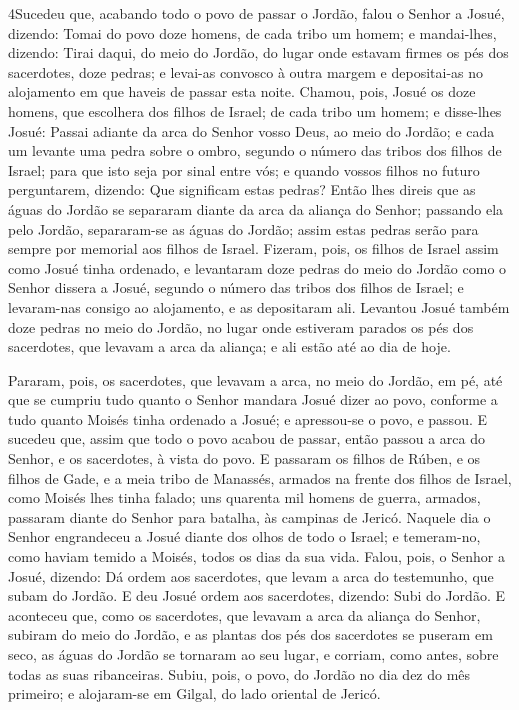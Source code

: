 \medskip

\lettrine{4} Sucedeu que, acabando todo o povo de passar o
Jordão, falou o Senhor a Josué, dizendo: Tomai do povo doze
homens, de cada tribo um homem; e mandai-lhes, dizendo: Tirai
daqui, do meio do Jordão, do lugar onde estavam firmes os pés dos
sacerdotes, doze pedras; e levai-as convosco à outra margem e
depositai-as no alojamento em que haveis de passar esta noite.
Chamou, pois, Josué os doze homens, que escolhera dos filhos de
Israel; de cada tribo um homem; e disse-lhes Josué: Passai
adiante da arca do Senhor vosso Deus, ao meio do Jordão; e cada um
levante uma pedra sobre o ombro, segundo o número das tribos dos
filhos de Israel; para que isto seja por sinal entre vós; e
quando vossos filhos no futuro perguntarem, dizendo: Que significam
estas pedras? Então lhes direis que as águas do Jordão se
separaram diante da arca da aliança do Senhor; passando ela pelo
Jordão, separaram-se as águas do Jordão; assim estas pedras serão
para sempre por memorial aos filhos de Israel. Fizeram, pois, os
filhos de Israel assim como Josué tinha ordenado, e levantaram doze
pedras do meio do Jordão como o Senhor dissera a Josué, segundo o
número das tribos dos filhos de Israel; e levaram-nas consigo ao
alojamento, e as depositaram ali. Levantou Josué também doze
pedras no meio do Jordão, no lugar onde estiveram parados os pés dos
sacerdotes, que levavam a arca da aliança; e ali estão até ao dia de
hoje.

Pararam, pois, os sacerdotes, que levavam a arca, no meio do
Jordão, em pé, até que se cumpriu tudo quanto o Senhor mandara Josué
dizer ao povo, conforme a tudo quanto Moisés tinha ordenado a Josué;
e apressou-se o povo, e passou. E sucedeu que, assim que todo
o povo acabou de passar, então passou a arca do Senhor, e os
sacerdotes, à vista do povo. E passaram os filhos de Rúben, e
os filhos de Gade, e a meia tribo de Manassés, armados na frente dos
filhos de Israel, como Moisés lhes tinha falado; uns quarenta
mil homens de guerra, armados, passaram diante do Senhor para
batalha, às campinas de Jericó. Naquele dia o Senhor
engrandeceu a Josué diante dos olhos de todo o Israel; e temeram-no,
como haviam temido a Moisés, todos os dias da sua vida.
Falou, pois, o Senhor a Josué, dizendo: Dá ordem aos
sacerdotes, que levam a arca do testemunho, que subam do Jordão.
E deu Josué ordem aos sacerdotes, dizendo: Subi do Jordão.
E aconteceu que, como os sacerdotes, que levavam a arca da
aliança do Senhor, subiram do meio do Jordão, e as plantas dos pés
dos sacerdotes se puseram em seco, as águas do Jordão se tornaram ao
seu lugar, e corriam, como antes, sobre todas as suas ribanceiras.
Subiu, pois, o povo, do Jordão no dia dez do mês primeiro; e
alojaram-se em Gilgal, do lado oriental de Jericó.

